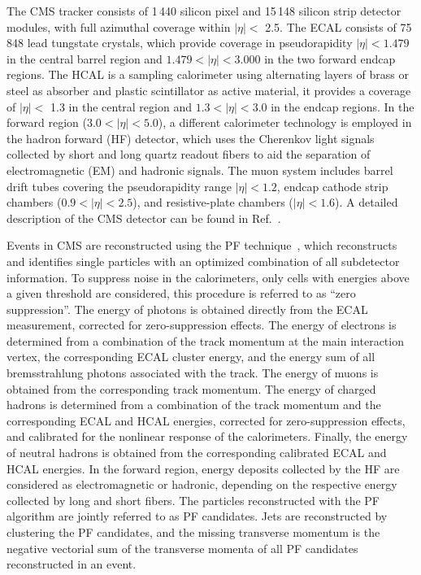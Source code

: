\documentclass[11pt,twoside,a4paper,cmspaper,final,collab]{cms-tdr}
\begin{document}
The CMS tracker consists of 1\,440 silicon pixel and 15\,148 silicon
strip detector modules, with full azimuthal coverage within $ \vert \eta \vert <$ 2.5.
The ECAL consists of 75\,848 lead
tungstate crystals, which provide coverage in pseudorapidity $\vert
\eta \vert< 1.479$ in the central barrel region and $1.479 <\vert \eta \vert < 3.000$ in the two forward endcap regions.
The HCAL is a sampling calorimeter using alternating layers of brass or steel as
absorber and plastic scintillator as active material, it provides a coverage of $\vert\eta\vert <$ 1.3 in the central
region and $1.3< \vert \eta \vert <3.0$ in the endcap regions.  In the forward region ($3.0<  \vert \eta \vert < 5.0$), a different
calorimeter technology is employed in the hadron forward (HF) detector, which uses the Cherenkov light signals collected by short and
long quartz readout fibers to aid the separation of electromagnetic (EM) and hadronic signals. The muon system
includes barrel drift tubes covering the pseudorapidity range $ \vert \eta \vert <
1.2$, endcap cathode strip chambers ($0.9<  \vert \eta \vert < 2.5$), and
resistive-plate chambers ($ \vert \eta \vert < 1.6$).
A detailed description of the CMS detector can be found in Ref.~\cite{CMSdetector}.

Events in CMS are reconstructed using the PF technique~\cite{CMS-PAS-PFT-09-001, CMS-PAS-PFT-10-001}, which reconstructs and identifies
single particles with an optimized combination of all subdetector information.
To suppress noise in the calorimeters, only cells with energies above a given threshold are considered, this procedure is referred to as ``zero suppression''.
The energy of photons is obtained directly from the ECAL measurement, corrected for zero-suppression effects.
The energy of electrons is determined from a combination of the track momentum at the main interaction vertex, the corresponding ECAL cluster energy, and the energy sum of all bremsstrahlung photons associated with the track.
The energy of muons is obtained from the corresponding track momentum.
The energy of charged hadrons is determined from a combination of the track momentum
and the corresponding ECAL and HCAL energies, corrected for zero-suppression effects,
and calibrated for the nonlinear response of the calorimeters.
Finally, the energy of neutral hadrons is obtained from the corresponding calibrated ECAL and HCAL energies.
In the forward region, energy deposits collected by the HF are considered as electromagnetic or hadronic, depending on the respective energy collected by long and short fibers.
The particles reconstructed with the PF algorithm are jointly referred to as PF candidates. Jets are reconstructed by clustering the PF candidates, and the missing transverse momentum \ptvecmiss is the negative vectorial sum of the transverse momenta of all PF candidates reconstructed in an event.
\end{document}

